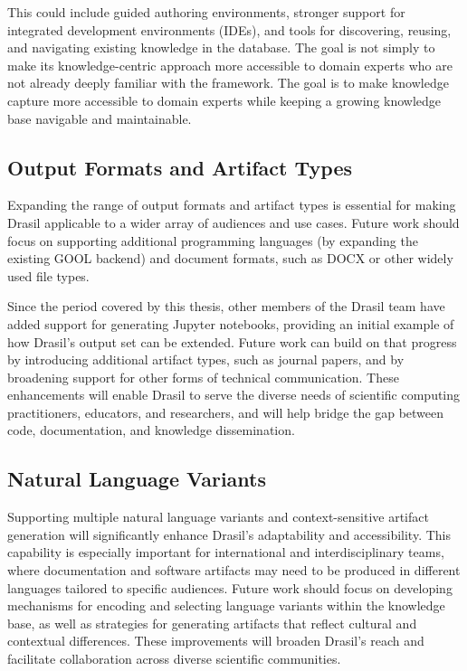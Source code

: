 This could include guided authoring environments, stronger support for
integrated development environments (IDEs), and tools for discovering, reusing,
and navigating existing knowledge in the database. The goal is not simply to 
make its knowledge-centric approach more accessible to domain experts who are 
not already deeply familiar with the framework. The goal is to make knowledge 
capture more accessible to domain experts while keeping a growing knowledge 
base navigable and maintainable.

\subsection{Output Formats and Artifact Types}
Expanding the range of output formats and artifact types is essential for
making Drasil applicable to a wider array of audiences and use cases.
Future work should focus on supporting additional programming languages
(by expanding the existing GOOL backend) and document formats, 
such as DOCX or other widely used file types.

Since the period covered by this thesis, other members of the Drasil team have 
added support for generating Jupyter notebooks, providing an initial example of 
how Drasil's output set can be extended.
Future work can build on that progress by introducing additional artifact 
types, such as journal papers, and by broadening support for other forms of 
technical communication. These enhancements will enable Drasil to serve the 
diverse needs of scientific computing practitioners, educators, and 
researchers, and will help bridge the gap between code, documentation, and 
knowledge dissemination.

\subsection{Natural Language Variants}
Supporting multiple natural language variants and context-sensitive artifact
generation will significantly enhance Drasil's adaptability and accessibility.
This capability is especially important for international and interdisciplinary
teams, where documentation and software artifacts may need to be produced in
different languages tailored to specific audiences. Future work should
focus on developing mechanisms for encoding and selecting language variants
within the knowledge base, as well as strategies for generating artifacts
that reflect cultural and contextual differences. These improvements will
broaden Drasil's reach and facilitate collaboration across diverse scientific
communities.

